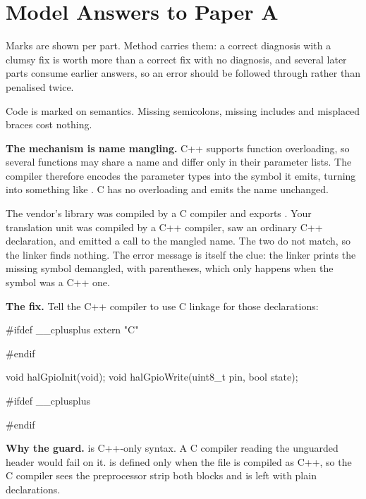 
\renewcommand{\answerprefix}{ansa}

\chapter{Model Answers to Paper A}
\label{ansa:ch:answers}

Marks are shown per part. Method carries them: a correct diagnosis with a clumsy fix is worth more
than a correct fix with no diagnosis, and several later parts consume earlier answers, so an error
should be followed through rather than penalised twice.

Code is marked on semantics. Missing semicolons, missing includes and misplaced braces cost
nothing.


\textbf{The mechanism is name mangling.} C++ supports function overloading, so several functions
may share a name and differ only in their parameter lists. The compiler therefore encodes the
parameter types into the symbol it emits, turning  into something like
. C has no overloading and emits the name unchanged.

The vendor's library was compiled by a C compiler and exports . Your
translation unit was compiled by a C++ compiler, saw an ordinary C++ declaration, and emitted a call
to the mangled name. The two do not match, so the linker finds nothing. The error message is itself
the clue: the linker prints the missing symbol demangled,  with parentheses,
which only happens when the symbol was a C++ one. 

\textbf{The fix.} Tell the C++ compiler to use C linkage for those declarations:

\begin{ccode}
#ifdef __cplusplus
extern "C" {
#endif

void halGpioInit(void);
void halGpioWrite(uint8_t pin, bool state);

#ifdef __cplusplus
}
#endif
\end{ccode}

\textbf{Why the guard.}  is C++-only syntax. A C compiler reading the unguarded
header would fail on it.  is defined only when the file is compiled as C++, so the
C compiler sees the preprocessor strip both blocks and is left with plain declarations. 

